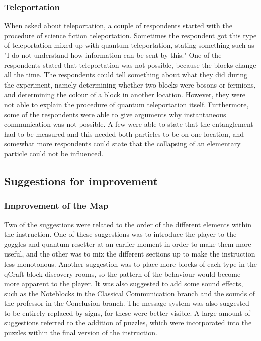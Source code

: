 \documentclass[11pt,twoside]{report} %
\begin{document}
\subsubsection{Teleportation}

When asked about teleportation, a couple of respondents started with the procedure of science fiction teleportation. Sometimes the respondent got this type of teleportation mixed up with quantum teleportation, stating something such as "I do not understand how information can be sent by this." One of the respondents stated that teleportation was not possible, because the blocks change all the time. The respondents could tell something about what they did during the experiment, namely determining whether two blocks were bosons or fermions, and determining the colour of a block in another location. However, they were not able to explain the procedure of quantum teleportation itself. Furthermore, some of the respondents were able to give arguments why instantaneous communication was not possible. A few were able to state that the entanglement had to be measured and this needed both particles to be on one location, and somewhat more respondents could state that the collapsing of an elementary particle could not be influenced.

\subsection{Suggestions for improvement}

\subsubsection{Improvement of the Map}

Two of the suggestions were related to the order of the different elements within the instruction. One of these suggestions was to introduce the player to the goggles and quantum resetter at an earlier moment in order to make them more useful, and the other was to mix the different sections up to make the instruction less monotonous. Another suggestion was to place more blocks of each type in the qCraft block discovery rooms, so the pattern of the behaviour would become more apparent to the player. It was also suggested to add some sound effects, such as the Noteblocks in the Classical Communication branch and the sounds of the professor in the Conclusion branch. The message system was also suggested to be entirely replaced by signs, for these were better visible. A large amount of suggestions referred to the addition of puzzles, which were incorporated into the puzzles within the final version of the instruction.
\end{document}
